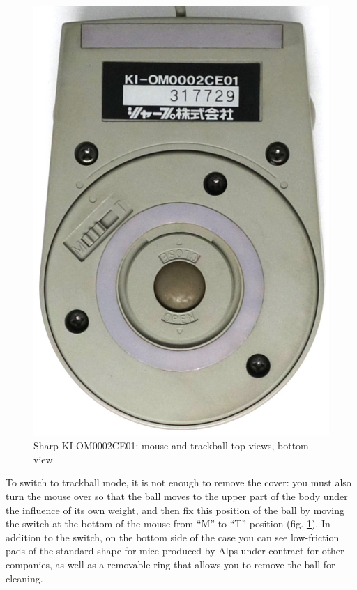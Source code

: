 \documentclass[11pt, a4paper]{article}
\begin{document}
\begin{figure}[h]
    \includegraphics[scale=0.6]{1987_sharp_convertible/bottom_30.jpg}
    \caption{Sharp KI-OM0002CE01: mouse and trackball top views, bottom view}
    \label{fig:SharpConvertibleTopAndBottom}
\end{figure}

To switch to trackball mode, it is not enough to remove the cover: you must also turn the mouse over so that the ball moves to the upper part of the body under the influence of its own weight, and then fix this position of the ball by moving the switch at the bottom of the mouse from  ``M'' to ``T'' position (fig. \ref{fig:SharpConvertibleTopAndBottom}). In addition to the switch, on the bottom side of the case you can see low-friction pads of the standard shape for mice produced by Alps under contract for other companies, as well as a removable ring that allows you to remove the ball for cleaning.
\end{document}
